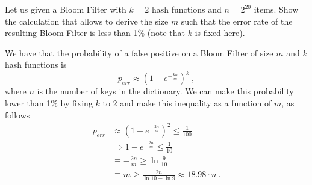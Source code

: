 \exercise

Let us given a Bloom Filter with $k = 2$ hash functions and $n = 2^{20}$ items.
Show the calculation that allows to derive the size $m$ such that the error rate
of the resulting Bloom Filter is less than 1\% (note that $k$ is fixed here).

\solution

We have that the probability of a false positive on a Bloom Filter of size $m$
and $k$ hash functions is $$p_{err} \approx \left(1 - e^{-\frac{kn}{m}}
\right)^k\ ,$$ where $n$ is the number of keys in the dictionary. We can make
this probability lower than 1\% by fixing $k$ to 2 and make this inequality as a
function of $m$, as follows
%
\begin{align*}
  p_{err} &\approx \left(1 - e^{-\frac{2n}{m}} \right)^2 \le \frac{1}{100} \\
  &\Rightarrow 1 - e^{-\frac{2n}{m}} \le \frac{1}{10} \\
  &\equiv -\frac{2n}{m} \ge \ln \frac{9}{10} \\
  &\equiv m \ge \frac{2n}{\ln 10 - \ln 9} \approx 18.98 \cdot n\ .
\end{align*}
